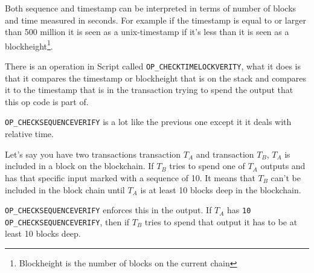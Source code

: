 Both sequence and timestamp can be interpreted in terms of number of blocks and time measured in seconds. For example if the timestamp is equal to or larger than 500 million it is seen as a unix-timestamp if it's less than it is seen as a blockheight\footnote{Blockheight is the number of blocks on the current chain}.

There is an operation in Script called \texttt{OP\_CHECKTIMELOCKVERITY}, what it does is that it compares the timestamp or blockheight that is on the stack and compares it to the timestamp that is in the transaction trying to spend the output that this op code is part of. 

\texttt{OP\_CHECKSEQUENCEVERIFY} is a lot like the previous one except it it deals with relative time. 

Let's say you have two transactions transaction $T_A$ and transaction $T_B$, $T_A$ is included in a block on the blockchain. If $T_B$ tries to spend one of $T_A$ outputs and has that specific input marked with a  sequence of 10. It means that $T_B$ can't be included in the block chain until $T_A$ is at least 10 blocks deep in the blockchain.

\texttt{OP\_CHECKSEQUENCEVERIFY} enforces this in the output. If $T_A$ has \texttt{10 OP\_CHECKSEQUENCEVERIFY}, then if $T_B$ tries to spend that output it has to be at least 10 blocks deep.

